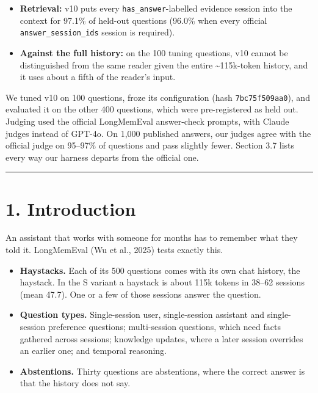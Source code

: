 \documentclass[11pt]{article}
\providecommand{\tightlist}{\setlength{\itemsep}{0pt}\setlength{\parskip}{0pt}}
\begin{document}
\begin{itemize}
\tightlist
\item
  \textbf{Retrieval:} v10 puts every \texttt{has\_answer}-labelled evidence session into the context for 97.1\% of
  held-out questions (96.0\% when every official \texttt{answer\_session\_ids} session is required).
\item
  \textbf{Against the full history:} on the 100 tuning questions, v10 cannot be distinguished from the same
  reader given the entire \textasciitilde115k-token history, and it uses about a fifth of the reader's input.
\end{itemize}

We tuned v10 on 100 questions, froze its configuration (hash \texttt{7bc75f509aa0}), and evaluated it on the other
400 questions, which were pre-registered as held out. Judging used the official LongMemEval answer-check
prompts, with Claude judges instead of GPT-4o. On 1,000 published answers, our judges agree with the
official judge on 95--97\% of questions and pass slightly fewer. Section 3.7 lists every way our harness
departs from the official one.

\begin{center}\rule{0.5\linewidth}{0.5pt}\end{center}

\hypertarget{introduction}{%
\section{1. Introduction}\label{introduction}}

An assistant that works with someone for months has to remember what they told it. LongMemEval (Wu et al., 2025) tests exactly this.

\begin{itemize}
\tightlist
\item
  \textbf{Haystacks.} Each of its 500 questions comes with its own chat history, the haystack. In the S variant
  a haystack is about 115k tokens in 38--62 sessions (mean 47.7). One or a few of those sessions answer the
  question.
\item
  \textbf{Question types.} Single-session user, single-session assistant and single-session preference questions;
  multi-session questions, which need facts gathered across sessions; knowledge updates, where a later
  session overrides an earlier one; and temporal reasoning.
\item
  \textbf{Abstentions.} Thirty questions are abstentions, where the correct answer is that the history does not
  say.
\end{itemize}
\end{document}
